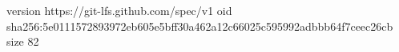 version https://git-lfs.github.com/spec/v1
oid sha256:5e0111572893972eb605e5bff30a462a12c66025c595992adbbb64f7ceec26cb
size 82
